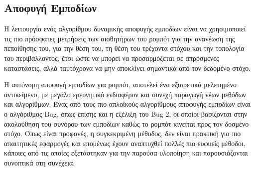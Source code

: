 \subsection{Αποφυγή Εμποδίων} \label{ssec:obstacle_avoidance}
Η λειτουργία ενός αλγορίθμου δυναμικής αποφυγής εμποδίων είναι να χρησιμοποιεί τις πιο πρόσφατες μετρήσεις των αισθητήρων του ρομπότ για την ανανέωση της πεποίθησης του, για την θέση του, τη θέση του τρέχοντα στόχου και την τοπολογία του περιβάλλοντος, έτσι ώστε να μπορεί να προσαρμόζεται σε απρόσμενες καταστάσεις, αλλά ταυτόχρονα να μην αποκλίνει σημαντικά από τον δεδομένο στόχο.

\bigskip
Η αυτόνομη αποφυγή εμποδίων για ρομπότ, αποτελεί ένα εξαιρετικά μελετημένο αντικείμενο, με μεγάλο ερευνητικό ενδιαφέρον και συνεχή παραγωγή νέων μεθόδων και αλγορίθμων. Ένας από τους πιο απλοϊκούς αλγορίθμους αποφυγής εμποδίων είναι ο αλγόριθμος Bug, όπως επίσης και η εξέλιξη του Bug 2, οι οποίοι βασίζονται στην ακολούθηση του συνόρου των εμποδίων καθώς το ρομπότ κινείται προς τον δοσμένο στόχο. Όπως είναι προφανές, η συγκεκριμένη μέθοδος, δεν είναι πρακτική για πιο απαιτητικές εφαρμογές και επομένως έχουν αναπτυχθεί πολλές πιο ευφυείς μέθοδοι, κάποιες από τις οποίες εξετάστηκαν για την παρούσα υλοποίηση και παρουσιάζονται συνοπτικά στη συνέχεια.

